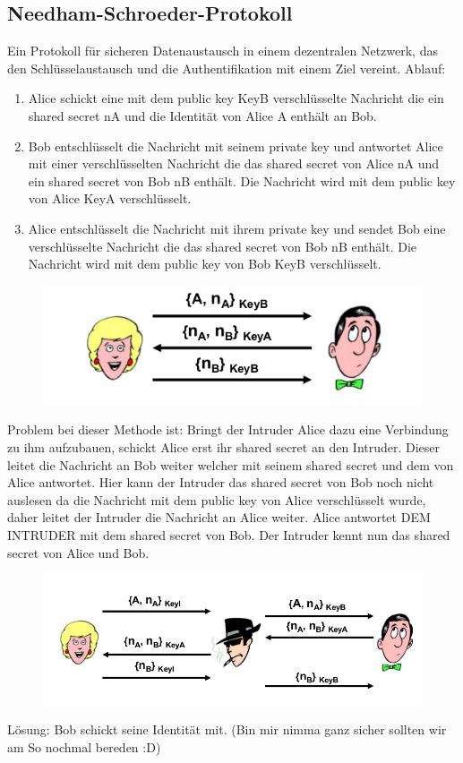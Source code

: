 \documentclass[a4paper, 12pt]{article}
\begin{document}
\subsection{Needham-Schroeder-Protokoll}
Ein Protokoll für sicheren Datenaustausch in einem dezentralen Netzwerk, das den Schlüsselaustausch und die Authentifikation mit einem Ziel vereint.
\large Ablauf:
\begin{enumerate}
	\item Alice schickt eine mit dem public key KeyB verschlüsselte Nachricht die ein shared secret nA und die Identität von Alice A enthält an Bob.
	\item Bob entschlüsselt die Nachricht mit seinem private key und antwortet Alice mit einer verschlüsselten Nachricht die das shared secret von Alice nA und ein shared secret von Bob nB enthält. Die Nachricht wird mit dem public key von Alice KeyA verschlüsselt.
	\item Alice entschlüsselt die Nachricht mit ihrem private key und sendet Bob eine verschlüsselte Nachricht die das shared secret von Bob nB enthält. Die Nachricht wird mit dem public key von Bob KeyB verschlüsselt.
\end{enumerate}
\begin{figure}[H]
\centering
\includegraphics{./img/ns_01}
\label{fig:ns_01}
\end{figure}
\large Problem bei dieser Methode ist:
Bringt der Intruder Alice dazu eine Verbindung zu ihm aufzubauen, schickt Alice erst ihr shared secret an den Intruder. Dieser leitet die Nachricht an Bob weiter welcher mit seinem shared secret und dem von Alice antwortet. Hier kann der Intruder das shared secret von Bob noch nicht auslesen da die Nachricht mit dem public key von Alice verschlüsselt wurde, daher leitet der Intruder die Nachricht an Alice weiter. Alice antwortet DEM INTRUDER mit dem shared secret von Bob.
\newline
Der Intruder kennt nun das shared secret von Alice und Bob.
\begin{figure}[H]
\centering
\includegraphics[width=\linewidth]{./img/ns_02}
\label{fig:ns_02}
\end{figure}
\large Lösung:
Bob schickt seine Identität mit. (Bin mir nimma ganz sicher sollten wir am So nochmal bereden :D)
\end{document}
